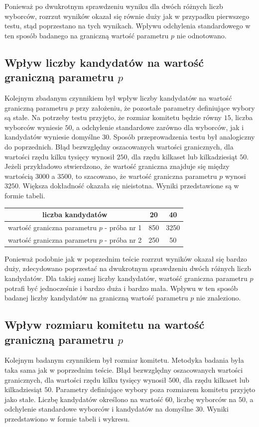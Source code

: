 \documentclass[pdflatex,11pt]{../aghdoc_version2}
\begin{document}
Ponieważ po dwukrotnym sprawdzeniu wyniku dla dwóch różnych liczb wyborców, rozrzut wyników okazał się równie duży jak w przypadku pierwszego testu, stąd poprzestano na tych wynikach. Wpływu odchylenia standardowego w ten sposób badanego na graniczną wartość parametru $p$ nie odnotowano.

\subsection{Wpływ liczby kandydatów na wartość graniczną parametru $p$}
Kolejnym zbadanym czynnikiem był wpływ liczby kandydatów na wartość graniczną parametru $p$ przy założeniu, że pozostałe parametry definiujące wybory są stałe. Na potrzeby testu przyjęto, że rozmiar komitetu będzie równy $15$, liczba wyborców wyniesie $50$, a odchylenie standardowe zarówno dla wyborców, jak i kandydatów wyniesie domyślne $30$. Sposób przeprowadzenia testu był analogiczny do poprzednich. Błąd bezwzględny oszacowanych wartości granicznych, dla wartości rzędu kilku tysięcy wynosił $250$, dla rzędu kilkaset lub kilkadziesiąt $50$. Jeżeli przykładowo stwierdzono, że wartość graniczna znajduje się między wartością $3000$ a $3500$, to szacowano, że wartość graniczna parametru $p$ wynosi $3250$. Większa dokładność okazała się nieistotna. Wyniki przedstawione są w formie tabeli.

\begin{center}
\begin{tabular}{|c|c|c|}
   \hline 
   liczba kandydatów & 20 & 40 \\ 
   \hline 
   wartość graniczna parametru $p$ - próba nr 1 & 850 & 3250 \\ 
   \hline 
   wartość graniczna parametru $p$ - próba nr 2 & 250 & 50 \\ 
   \hline 
\end{tabular}    
\end{center}

Ponieważ podobnie jak w poprzednim teście rozrzut wyników okazał się bardzo duży, zdecydowano poprzestać na dwukrotnym sprawdzeniu dwóch różnych liczb kandydatów. Dla takiej samej liczby kandydatów, wartość graniczna parametru $p$ potrafi być jednocześnie i bardzo duża i bardzo mała. Wpływu w ten sposób badanej liczby kandydatów na graniczną wartość parametru $p$ nie znaleziono.

\subsection{Wpływ rozmiaru komitetu na wartość graniczną parametru $p$}
Kolejnym badanym czynnikiem był rozmiar komitetu. Metodyka badania była taka sama jak w poprzednim teście. Błąd bezwzględny oszacowanych wartości granicznych, dla wartości rzędu kilku tysięcy wynosił $500$, dla rzędu kilkaset lub kilkadziesiąt $50$. Parametry definiujące wybory poza rozmiarem komitetu przyjęto jako stałe. Liczbę kandydatów określono na wartość $60$, liczbę wyborców na 50, a odchylenie standardowe wyborców i kandydatów na domyślne $30$. Wyniki przedstawiono w formie tabeli i wykresu. 
\end{document}
